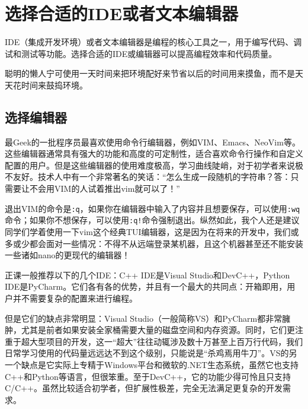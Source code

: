 \documentclass[../main.tex]{subfiles}
\begin{document}
\section{选择合适的IDE或者文本编辑器}

IDE（集成开发环境）或者文本编辑器是编程的核心工具之一，用于编写代码、调试和测试等功能。选择合适的IDE或编辑器可以提高编程效率和代码质量。

聪明的懒人宁可使用一天时间来把环境配好来节省以后的时间用来摸鱼，而不是天天花时间来鼓捣环境。

\subsection{选择编辑器}

最Geek的一批程序员最喜欢使用命令行编辑器，例如VIM、Emacs、NeoVim等。这些编辑器通常具有强大的功能和高度的可定制性，适合喜欢命令行操作和自定义配置的用户。但是这些编辑器的使用难度极高，学习曲线陡峭，对于初学者来说极不友好。技术人中有一个非常著名的笑话：“怎么生成一段随机的字符串？答：只需要让不会用VIM的人试着推出vim就可以了！”

\begin{tip}
  退出VIM的命令是\texttt{:q}，如果你在编辑器中输入了内容并且想要保存，可以使用\texttt{:wq}命令；如果你不想保存，可以使用\texttt{:q!}命令强制退出。纵然如此，我个人还是建议同学们学着使用一下vim这个经典TUI编辑器，这是因为在将来的开发中，我们或多或少都会面对一些情况：不得不从远端登录某机器，且这个机器甚至还不能安装一些诸如nano的更现代的编辑器！
\end{tip}

正课一般推荐以下的几个IDE：C++ IDE是Visual Studio和DevC++，Python IDE是PyCharm。它们各有各的优势，并且有一个最大的共同点：开箱即用，用户并不需要复杂的配置来进行编程。

但是它们的缺点非常明显：Visual Studio（一般简称VS）和PyCharm都非常臃肿，尤其是前者如果安装全家桶需要大量的磁盘空间和内存资源。同时，它们更注重于超大型项目的开发，这一“超大”往往动辄涉及数十万甚至上百万行代码，我们日常学习使用的代码量远远达不到这个级别，只能说是“杀鸡焉用牛刀”。VS的另一个缺点是它实际上专精于Windows平台和微软的.NET生态系统，虽然它也支持C++和Python等语言，但很笨重。至于DevC++，它的功能少得可怜且只支持C/C++。虽然比较适合初学者，但扩展性极差，完全无法满足更复杂的开发需求。
\end{document}
